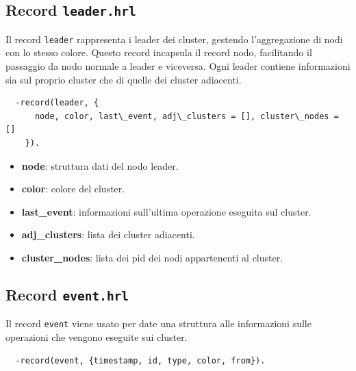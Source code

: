 \documentclass[12pt, a4paper]{report}
\begin{document}
\subsection{Record \texttt{leader.hrl}}

Il record \texttt{leader} rappresenta i leader dei cluster, gestendo l’aggregazione di nodi con lo stesso colore. Questo record incapsula il record nodo, facilitando il passaggio da nodo normale a leader e viceversa. Ogni leader contiene informazioni sia sul proprio cluster che di quelle dei cluster adiacenti.

\begin{tcolorbox}[title=Definizione del record \texttt{leader}]
\begin{verbatim}
  -record(leader, {
      node, color, last\_event, adj\_clusters = [], cluster\_nodes = []
    }).
\end{verbatim}
\end{tcolorbox}

\begin{itemize}
    \item \textbf{node}: struttura dati del nodo leader.
    \item \textbf{color}: colore del cluster.
    \item \textbf{last\_event}: informazioni sull'ultima operazione eseguita sul cluster.
    \item \textbf{adj\_clusters}: lista dei cluster adiacenti.
    \item \textbf{cluster\_nodes}: lista dei pid dei nodi appartenenti al cluster.
\end{itemize}

\subsection{Record \texttt{event.hrl}}

Il record \texttt{event} viene usato per date una struttura alle informazioni sulle operazioni che vengono eseguite sui cluster.

\begin{tcolorbox}[title=Definizione del record \texttt{event}]
\begin{verbatim}
  -record(event, {timestamp, id, type, color, from}).
\end{verbatim}
\end{tcolorbox}
\end{document}
